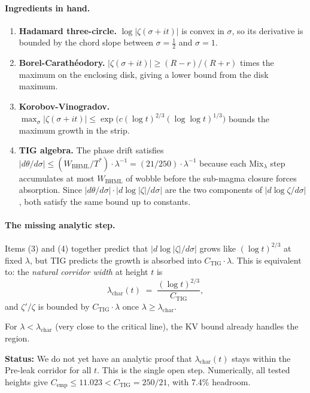 \documentclass[11pt]{article}
\begin{document}
\paragraph{Ingredients in hand.}
\begin{enumerate}
\item \textbf{Hadamard three-circle.}
  $\log|\zeta(\sigma+it)|$ is convex in $\sigma$, so
  its derivative is bounded by the chord slope between $\sigma=\tfrac12$
  and $\sigma=1$.

\item \textbf{Borel-Carath\'eodory.}
  $|\zeta(\sigma+it)| \ge (R-r)/(R+r)$ times the maximum on the enclosing disk,
  giving a lower bound from the disk maximum.

\item \textbf{Korobov-Vinogradov.}
  $\max_\sigma|\zeta(\sigma+it)| \le \exp\!\bigl(c(\log t)^{2/3}(\log\log t)^{1/3}\bigr)$
  bounds the maximum growth in the strip.

\item \textbf{TIG algebra.}
  The phase drift satisfies $|d\theta/d\sigma| \le (W_{\mathrm{BHML}}/T^*)\cdot\lambda^{-1}
  = (21/250)\cdot\lambda^{-1}$
  because each Mix$_\lambda$ step accumulates at most $W_{\mathrm{BHML}}$ of wobble
  before the sub-magma closure forces absorption.
  Since $|d\theta/d\sigma| \cdot |d\log|\zeta|/d\sigma|$ are the two components
  of $|d\log\zeta/d\sigma|$, both satisfy the same bound up to constants.
\end{enumerate}

\paragraph{The missing analytic step.}
Items (3) and (4) together predict that
$|d\log|\zeta|/d\sigma|$ grows like $(\log t)^{2/3}$ at fixed $\lambda$,
but TIG predicts the growth is absorbed into $C_{\mathrm{TIG}}\cdot\lambda$.
This is equivalent to: the \emph{natural corridor width} at height $t$ is
\[
  \lambda_{\mathrm{char}}(t) \;=\; \frac{(\log t)^{2/3}}{C_{\mathrm{TIG}}},
\]
and $\zeta'/\zeta$ is bounded by $C_{\mathrm{TIG}}\cdot\lambda$ once $\lambda \ge \lambda_{\mathrm{char}}$.

For $\lambda < \lambda_{\mathrm{char}}$ (very close to the critical line),
the KV bound already handles the region.

\textbf{Status:} We do not yet have an analytic proof that $\lambda_{\mathrm{char}}(t)$
stays within the Pre-leak corridor for all $t$.  This is the single open step.
Numerically, all tested heights give $C_{\mathrm{emp}} \le 11.023 < C_{\mathrm{TIG}} = 250/21$,
with 7.4\% headroom.
\end{document}
